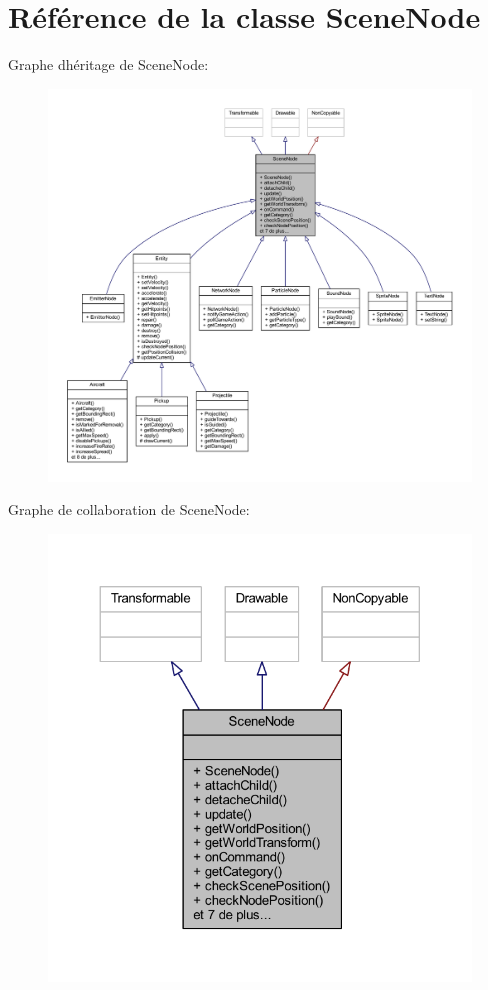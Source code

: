 \hypertarget{class_scene_node}{}\section{Référence de la classe Scene\+Node}
\label{class_scene_node}


Graphe d\textquotesingle{}héritage de Scene\+Node\+:\nopagebreak
\begin{figure}[H]
\begin{center}
\leavevmode
\includegraphics[width=350pt]{class_scene_node__inherit__graph}
\end{center}
\end{figure}


Graphe de collaboration de Scene\+Node\+:\nopagebreak
\begin{figure}[H]
\begin{center}
\leavevmode
\includegraphics[width=324pt]{class_scene_node__coll__graph}
\end{center}
\end{figure}
